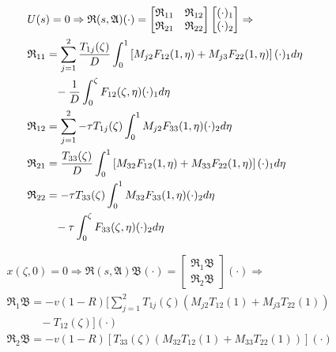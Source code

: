     \begin{equation} \label{eq:2_resolvent_x}
    \begin{aligned}
        &U(s) = 0 \Rightarrow \mathfrak{R}(s, \mathfrak{A}) {(\cdot)} = \begin{bmatrix}
            \mathfrak{R}_{11} & \mathfrak{R}_{12}\\
            \mathfrak{R}_{21} & \mathfrak{R}_{22}
        \end{bmatrix} \begin{bmatrix}
            (\cdot)_1\\ (\cdot)_2
        \end{bmatrix} \Rightarrow\\
        &\mathfrak{R}_{11} = \sum_{j=1}^2 \frac{T_{1j}(\zeta)}{D} \int_0^1 \left[ M_{j2} F_{12}(1,\eta) + M_{j3} F_{22}(1,\eta) \right] (\cdot)_1 d\eta\\
        &\hspace{2.5em} -\frac{1}{D} \int_0^{\zeta} F_{12}(\zeta, \eta) (\cdot)_1 d\eta\\
        &\mathfrak{R}_{12} = \sum_{j=1}^2 -\tau T_{1j}(\zeta) \int_0^1 M_{j2} F_{33}(1,\eta) (\cdot)_2 d\eta\\
        &\mathfrak{R}_{21} = \frac{T_{33}(\zeta)}{D} \int_0^1 \left[ M_{32} F_{12}(1,\eta) + M_{33} F_{22}(1,\eta) \right] (\cdot)_1 d\eta\\
        &\mathfrak{R}_{22} = -\tau T_{33}(\zeta) \int_0^1 M_{32} F_{33}(1,\eta) (\cdot)_2 d\eta\\
        &\hspace{2.5em} -\tau \int_0^{\zeta} F_{33}(\zeta, \eta) (\cdot)_2 d\eta
    \end{aligned}
    \end{equation}
    
    \begin{equation} \label{eq:2_resolvent_u}
    \begin{aligned}
        &{x}(\zeta,0) = 0 \Rightarrow \mathfrak{R}(s, \mathfrak{A}) \mathfrak{B} (\cdot) = \begin{bmatrix}
            \mathfrak{R}_{1} \mathfrak{B}\\
            \mathfrak{R}_{2} \mathfrak{B}
        \end{bmatrix} (\cdot) \Rightarrow\\
        &\mathfrak{R}_{1} \mathfrak{B} = -v(1-R) \bigl[ \sum_{j=1}^{2} T_{1j}(\zeta) (M_{j2} T_{12}(1) + M_{j3} T_{22}(1)) \\
        &\hspace{3em} - T_{12}(\zeta) \bigr] (\cdot)\\
        &\mathfrak{R}_{2} \mathfrak{B} = -v(1-R) \left[ T_{33}(\zeta) (M_{32} T_{12}(1) + M_{33} T_{22}(1)) \right] (\cdot)
    \end{aligned}
    \end{equation}

